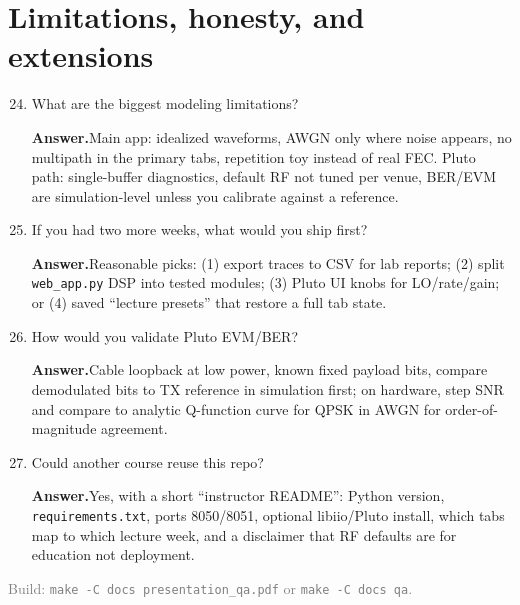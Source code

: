 \documentclass[11pt]{article}
\newenvironment{qaitem}{%
  \begin{enumerate}[label=\textbf{Q\arabic*.}, leftmargin=2.2em, itemsep=1.1em, listparindent=0pt]
}{%
  \end{enumerate}%
}
\newcommand{\Ans}{\par\noindent\textbf{Answer.}\quad}
\begin{document}
\section*{Limitations, honesty, and extensions}

\begin{qaitem}
  \setcounter{enumi}{23}
  \item What are the biggest modeling limitations?
  \Ans Main app: idealized waveforms, AWGN only where noise appears, no multipath in the primary tabs, repetition toy instead of real FEC. Pluto path: single-buffer diagnostics, default RF not tuned per venue, BER/EVM are simulation-level unless you calibrate against a reference.

  \item If you had two more weeks, what would you ship first?
  \Ans Reasonable picks: (1) export traces to CSV for lab reports; (2) split \texttt{web\_app.py} DSP into tested modules; (3) Pluto UI knobs for LO/rate/gain; or (4) saved ``lecture presets'' that restore a full tab state.

  \item How would you validate Pluto EVM/BER?
  \Ans Cable loopback at low power, known fixed payload bits, compare demodulated bits to TX reference in simulation first; on hardware, step SNR and compare to analytic Q-function curve for QPSK in AWGN for order-of-magnitude agreement.

  \item Could another course reuse this repo?
  \Ans Yes, with a short ``instructor README'': Python version, \texttt{requirements.txt}, ports 8050/8051, optional libiio/Pluto install, which tabs map to which lecture week, and a disclaimer that RF defaults are for education not deployment.
\end{qaitem}

\vfill
{\small\textcolor{gray}{Build: \texttt{make -C docs presentation\_qa.pdf} or \texttt{make -C docs qa}.}}
\end{document}
